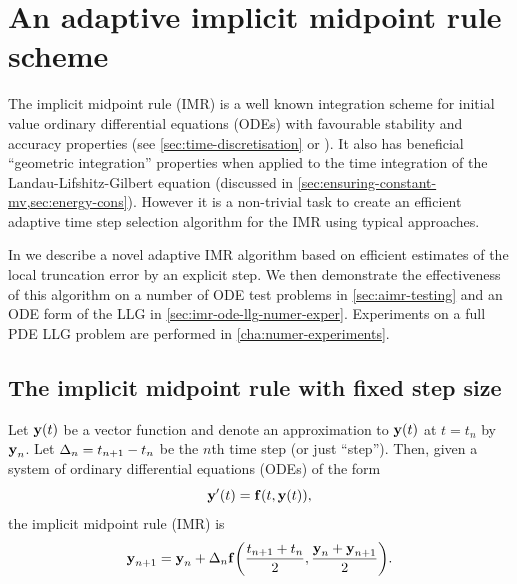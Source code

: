 






\chapter{An adaptive implicit midpoint rule scheme}
\label{sec:adaptive-imr}


The implicit midpoint rule (IMR) is a well known integration scheme for initial value ordinary differential equations (ODEs) with favourable stability and accuracy properties (see \cref{sec:time-discretisation} or \cite[204]{HairerNorsettWanner}).
It also has beneficial ``geometric integration'' properties when applied to the time integration of the Landau-Lifshitz-Gilbert equation (discussed in \cref{sec:ensuring-constant-mv,sec:energy-cons}).
However it is a non-trivial task to create an efficient adaptive time step selection algorithm for the IMR using typical approaches.

In  we describe a novel adaptive IMR algorithm based on efficient estimates of the local truncation error by an explicit step.
We then demonstrate the effectiveness of this algorithm on a number of ODE test problems in \cref{sec:aimr-testing} and an ODE form of the LLG in \cref{sec:imr-ode-llg-numer-exper}.
Experiments on a full PDE LLG problem are performed in \cref{cha:numer-experiments}.


\section{The implicit midpoint rule with fixed step size}
\label{sec:fixed-step-implicit}

Let $\boldsymbol{\mathrm{y}}(t)$ be a vector function and denote an approximation to $\boldsymbol{\mathrm{y}}(t)$ at $t = t_n$ by $\boldsymbol{\mathrm{y}}_n$.
Let $\Delta_{n} = t_{n+1} - t_n$ be the $n$th time step (or just ``step'').
Then, given a system of ordinary differential equations (ODEs) of the form
\begin{equation}
  \boldsymbol{\mathrm{y}}'(t) = {\boldsymbol{\mathrm{f}}{\left( t, \boldsymbol{\mathrm{y}}(t) \right)}},
  \label{eq:43}
\end{equation}
the implicit midpoint rule (IMR) is
\begin{equation}
    \boldsymbol{\mathrm{y}}_{n+1} = \boldsymbol{\mathrm{y}}_n + \Delta_{n} {\boldsymbol{\mathrm{f}}{\left( \frac{t_{n+1} + t_n}{2}, \frac{\boldsymbol{\mathrm{y}}_n + \boldsymbol{\mathrm{y}}_{n+1}}{2} \right)}}.
    \label{eq:67}
\end{equation}

